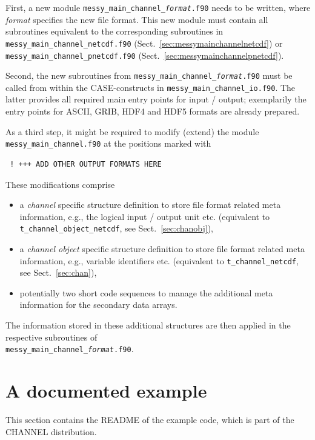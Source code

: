 \documentclass[twoside]{article}
\begin{document}
First, a new module
{\tt messy\_main\_channel\_{\it format}.f90} needs to be written, where
{\it format} specifies the new file format. This new module must contain
all subroutines equivalent to the corresponding subroutines in\\
{\tt messy\_main\_channel\_netcdf.f90}
(Sect.~\ref{sec:messymainchannelnetcdf}) or
{\tt messy\_main\_channel\_pnetcdf.f90}
(Sect.~\ref{sec:messymainchannelpnetcdf}).

Second, the new subroutines from {\tt messy\_main\_channel\_{\it format}.f90}
must be called from within the CASE-constructs in
{\tt messy\_main\_channel\_io.f90}. The latter provides all required
main entry points for input / output; exemplarily the entry points
for ASCII, GRIB, HDF4 and HDF5 formats are already prepared.

As a third step, it might be required to modify (extend) the module
{\tt messy\_main\_channel.f90} at the positions marked with
\begin{verbatim}
 ! +++ ADD OTHER OUTPUT FORMATS HERE
\end{verbatim}
These modifications comprise
\begin{itemize}
  \item a {\it channel} specific structure definition to store file format
        related meta information, e.g., the logical input / output unit etc.
        (equivalent to {\tt t\_channel\_object\_netcdf},
         see Sect.~\ref{sec:chanobj}),
  \item a {\it channel object} specific structure definition to store file
        format related meta information, e.g., variable identifiers etc.
        (equivalent to {\tt t\_channel\_netcdf}, see Sect.~\ref{sec:chan}),
  \item potentially two short code sequences to manage the additional
        meta information for the secondary data arrays.
\end{itemize}
The information stored in these additional structures are then applied in the
respective subroutines of\\
{\tt messy\_main\_channel\_{\it format}.f90}.

\section{A documented example}
%
This section contains the README of the example code, which is part of the
CHANNEL distribution.
\end{document}
